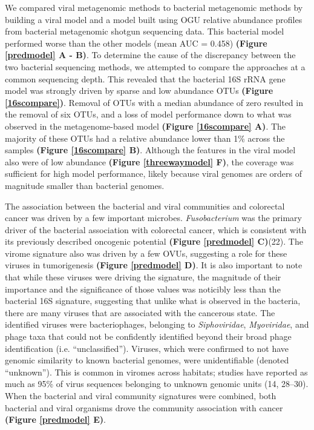 \documentclass[12pt,]{article}
\begin{document}
We compared viral metagenomic methods to bacterial metagenomic methods
by building a viral model and a model built using OGU relative abundance
profiles from bacterial metagenomic shotgun sequencing data. This
bacterial model performed worse than the other models (mean AUC = 0.458)
\textbf{(Figure \ref{predmodel} A - B)}. To determine the cause of the
discrepancy between the two bacterial sequencing methods, we attempted
to compare the approaches at a common sequencing depth. This revealed
that the bacterial 16S rRNA gene model was strongly driven by sparse and
low abundance OTUs \textbf{(Figure \ref{16scompare})}. Removal of OTUs
with a median abundance of zero resulted in the removal of six OTUs, and
a loss of model performance down to what was observed in the
metagenome-based model \textbf{(Figure \ref{16scompare} A)}. The
majority of these OTUs had a relative abundance lower than 1\% across
the samples \textbf{(Figure \ref{16scompare} B)}. Although the features
in the viral model also were of low abundance \textbf{(Figure
\ref{threewaymodel} F)}, the coverage was sufficient for high model
performance, likely because viral genomes are orders of magnitude
smaller than bacterial genomes.

The association between the bacterial and viral communities and
colorectal cancer was driven by a few important microbes.
\emph{Fusobacterium} was the primary driver of the bacterial association
with colorectal cancer, which is consistent with its previously
described oncogenic potential \textbf{(Figure \ref{predmodel} C)}(22).
The virome signature also was driven by a few OVUs, suggesting a role
for these viruses in tumorigenesis \textbf{(Figure \ref{predmodel} D)}.
It is also important to note that while these viruses were driving the
signature, the magnitude of their importance and the significance of
those values was noticibly less than the bacterial 16S signature,
suggesting that unlike what is observed in the bacteria, there are many
viruses that are associated with the cancerous state. The identified
viruses were bacteriophages, belonging to \emph{Siphoviridae},
\emph{Myoviridae}, and phage taxa that could not be confidently
identified beyond their broad phage identification (i.e.
``unclassified''). Viruses, which were confirmed to not have genomic
similarity to known bacterial genomes, were unidentifiable (denoted
``unknown''). This is common in viromes across habitats; studies have
reported as much as 95\% of virus sequences belonging to unknown genomic
units (14, 28--30). When the bacterial and viral community signatures
were combined, both bacterial and viral organisms drove the community
association with cancer \textbf{(Figure \ref{predmodel} E)}.
\end{document}

